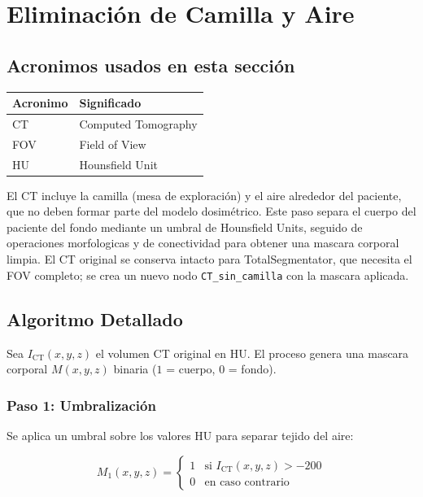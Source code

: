 \documentclass[12pt,a4paper]{article}
\begin{document}
\section{Eliminación de Camilla y Aire}
\label{sec:camilla}

\subsection*{Acronimos usados en esta sección}
\begin{tabular}{ll}
\toprule
\textbf{Acronimo} & \textbf{Significado} \\
\midrule
CT & Computed Tomography \\
FOV & Field of View \\
HU & Hounsfield Unit \\
\bottomrule
\end{tabular}

El CT incluye la camilla (mesa de exploración) y el aire alrededor del paciente, que no deben
formar parte del modelo dosimétrico. Este paso separa el cuerpo del paciente del fondo mediante
un umbral de Hounsfield Units, seguido de operaciones morfologicas y de conectividad para obtener
una mascara corporal limpia. El CT original se conserva intacto para TotalSegmentator, que
necesita el FOV completo; se crea un nuevo nodo \texttt{CT\_sin\_camilla} con la mascara aplicada.

\subsection{Algoritmo Detallado}

Sea $I_{\text{CT}}(x,y,z)$ el volumen CT original en HU. El proceso genera una mascara corporal
$M(x,y,z)$ binaria ($1$ = cuerpo, $0$ = fondo).

\subsubsection{Paso 1: Umbralización}

Se aplica un umbral sobre los valores HU para separar tejido del aire:

\begin{equation}\label{eq:umbral}
    M_1(x,y,z) = \begin{cases}
        1 & \text{si } I_{\text{CT}}(x,y,z) > -200 \\
        0 & \text{en caso contrario}
    \end{cases}
\end{equation}
\end{document}
